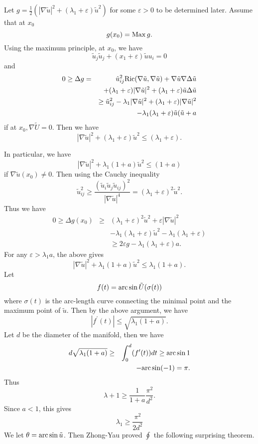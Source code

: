 Let $ g = \frac{1}{2} ( | \nabla \tilde{u} |^2 + ( \lambda _ 1 + \varepsilon ) \tilde{u} ^2) $ for some  $ \varepsilon > 0 $ to be determined later. Assume that at $ x _0$ 
%
\[ g(x_0) = {\rm Max}\, g.\]
Using the maximum principle, at $ x_0 $, we have 
%
\[ \tilde{u}_j \tilde{u}_{j} + (x_1 + \varepsilon ) \tilde{u} u _i = 0 \]
and
\begin{eqnarray*}
0 \geq \Delta g & = & \hat{u} ^2 _{ij}   {\rm Ric} ( \nabla \tilde{u}, \nabla \tilde{u} ) + \nabla \tilde{u} \nabla \Delta \tilde{u} \\
 && + ( \lambda _1 + \varepsilon ) |\nabla \tilde{u}|^2 + ( \lambda _1 + \varepsilon ) \tilde{u} \Delta \tilde{u}\\
&&\geq \tilde{u}^2 _{ij} - \lambda _1 |\nabla \tilde{u}|^2 + ( \lambda _1 + \varepsilon ) |\nabla \tilde{u}|^2 \\
&& - \lambda _1 (\lambda _1 + \varepsilon ) \tilde{u} ( \tilde{u} + a  
\end{eqnarray*}
%
if at $ x _0 , \nabla \tilde{U} = 0 $. Then we have 
%
\[ |\nabla \tilde{u}|^2 + ( \lambda _1 + \varepsilon ) \tilde{u} ^2 \leq ( \lambda _1 + \varepsilon ). \]

In particular, we have 
%
\[ |\nabla \tilde{u} |^2 + \lambda _1 (1+a ) \tilde{u} ^2 \leq (1+a )\]
if $ \nabla \tilde{u} (x_0) \neq 0$. Then using the Cauchy inequality 
%
\[ \tilde{u} ^2 _{ij} \geq \frac{(\tilde{u} _i \tilde{u}_j \tilde{u}_{ij} )^2}{|\nabla \tilde{u}|^4} = ( \lambda _1 + \varepsilon )^2 \tilde{u} ^2 .\] 
%
Thus we have 
\begin{eqnarray*}
0 \geq \Delta g (x_0) & \geq & ( \lambda _1 + \varepsilon )^2 \tilde{u}^2 + \varepsilon |\nabla \tilde{u}|^2\\
&& - \lambda _1 (\lambda _1 + \varepsilon) \tilde{u}^2 - \lambda _1 (\lambda _1 + \varepsilon )\\
&& \geq 2 \varepsilon g - \lambda _1 (\lambda _1 + \varepsilon )a.
\end{eqnarray*}
%
For any $ \varepsilon > \lambda _1 a $, the above gives 
\[ |\nabla \tilde{u}| ^2 + \lambda _1 (1 + a) \tilde{u}^2 \leq \lambda _1 (1 + a). \]
Let 
%
\[ f(t) =  {\rm arc} \sin \tilde{U} ( \sigma (t)) \]
%
where $ \sigma (t) $ is the arc-length curve connecting the minimal point and the maximum point of $ \tilde{u} $. Then by the above argument, we have 
%
\[ |f^\prime (t)|\leq \sqrt{\lambda _1 (1 + a) } .\]
%
Let $d$ be the diameter of the manifold, then we have 
%
\begin{eqnarray*} d \sqrt{\lambda_1 (1+a)} & \geq & \int ^d _0 ( f ^\prime (t) ) d t \geq  {\rm arc}  \sin 1 \\
&& - {\rm arc} \sin (-1) = \pi.
\end{eqnarray*}
Thus 
%
\[ \lambda +1 \geq \frac{1}{1+a} \frac{\pi^2}{d^2}.
\]
Since $ a < 1$, this gives
\[ \lambda_1 \geq \frac{\pi^2}{2d^2} \]
%
We let $ \theta =  {\rm arc} \sin \tilde{u}$. Then Zhong-Yau proved $ \oint $ the following surprising theorem.


